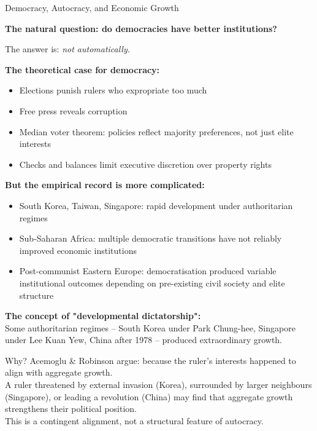 \documentclass[10pt]{beamer}
\begin{document}
\begin{frame}[allowframebreaks]{Democracy, Autocracy, and Economic Growth}

\textbf{The natural question: do democracies have better institutions?}


The answer is: \emph{not automatically.}


\textbf{The theoretical case for democracy:}
\begin{itemize}
\item Elections punish rulers who expropriate too much
\item Free press reveals corruption
\item Median voter theorem: policies reflect majority preferences, not just elite interests
\item Checks and balances limit executive discretion over property rights
\end{itemize}


\textbf{But the empirical record is more complicated:}
\begin{itemize}
\item South Korea, Taiwan, Singapore: rapid development under authoritarian regimes
\item Sub-Saharan Africa: multiple democratic transitions have not reliably improved economic institutions
\item Post-communist Eastern Europe: democratisation produced variable institutional outcomes depending on pre-existing civil society and elite structure
\end{itemize}


\textbf{The concept of "developmental dictatorship":}\\
Some authoritarian regimes -- South Korea under Park Chung-hee, Singapore under Lee Kuan Yew, China after 1978 -- produced extraordinary growth.


\alert{Why? Acemoglu \& Robinson argue: because the ruler's interests happened to align with aggregate growth.}\\[4pt]
A ruler threatened by external invasion (Korea), surrounded by larger neighbours (Singapore), or leading a revolution (China) may find that aggregate growth strengthens their political position.\\[4pt]
This is a contingent alignment, not a structural feature of autocracy.
\end{frame}
\end{document}
